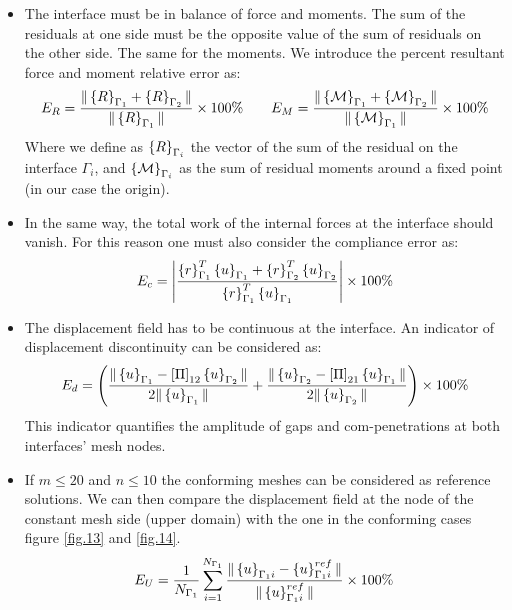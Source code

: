   \begin{itemize}
 \item The interface must be in balance of force and moments. The sum of the residuals at one side must be the opposite value of the sum of residuals on the other side. The same for the moments.
 We introduce the percent resultant force and moment relative error as:
 \begin{eqnarray}
 \label{eq.81}
 E_{R}=\frac{\|\left\lbrace{R}\right \rbrace_{\Gamma_1}+\left\lbrace{R}\right \rbrace_{\Gamma_2}\|}{\|\left\lbrace{R}\right \rbrace_{\Gamma_1}\|}\times 100 \% \qquad E_{M}=\frac{\|\left\lbrace{\mathcal{M}}\right \rbrace_{\Gamma_1}+\left\lbrace{\mathcal{M}}\right \rbrace_{\Gamma_2}\|}{\|\left\lbrace{\mathcal{M}}\right \rbrace_{\Gamma_1}\|}\times 100 \%
 \end{eqnarray}
 Where we define as $\left\lbrace{R}\right \rbrace_{\Gamma_i}$ the vector of the sum of the residual on the interface $\Gamma_i$, and $\left\lbrace{\mathcal{M}}\right \rbrace_{\Gamma_i}$ as the sum of residual moments around a fixed point (in our case the origin).
 \item In the same way, the total work of the internal forces at the interface should vanish. For this reason one must also consider the compliance error as:
 \begin{eqnarray}
 \label{eq.82}
 E_{c}=\left|\frac{\left\lbrace{r}\right \rbrace_{\Gamma_1}^T\left\lbrace{u}\right \rbrace_{\Gamma_1}+\left\lbrace{r}\right \rbrace_{\Gamma_2}^T\left\lbrace{u}\right \rbrace_{\Gamma_2}}{\left\lbrace{r}\right \rbrace_{\Gamma_1}^T\left\lbrace{u}\right \rbrace_{\Gamma_1}}\right|\times 100 \%
 \end{eqnarray}
 \item The displacement field has to be continuous at the interface. An indicator of displacement discontinuity can be considered as:
 \begin{eqnarray}
 \label{eq.83}
 E_{d}=\left(\frac{\|\left\lbrace{u}\right \rbrace_{\Gamma_1}-\left[{\Pi}\right]_{12}\left\lbrace{u}\right \rbrace_{\Gamma_2}\|}{2\|\left\lbrace{u}\right \rbrace_{\Gamma_1}\|}+\frac{\|\left\lbrace{u}\right \rbrace_{\Gamma_2}-\left[{\Pi}\right]_{21}\left\lbrace{u}\right \rbrace_{\Gamma_1}\|}{2\|\left\lbrace{u}\right \rbrace_{\Gamma_2}\|}\right)\times 100 \%
 \end{eqnarray}
 This indicator quantifies the amplitude of gaps and com-penetrations at both interfaces’ mesh nodes. 
 \item If $m\leq20$ and $n\leq 10$ the conforming meshes can be considered as reference solutions. We can then compare the displacement field at the node of the constant mesh side (upper domain) with the one in the conforming cases figure \ref{fig.13} and \ref{fig.14}.  
 \begin{eqnarray}
 \label{85}
 E_{U}=\frac{1}{N_{\Gamma_1}}\sum_{i=1}^{N_{\Gamma_1}}\frac{\|\VectorVar{u}_{\Gamma_1i}-\VectorVar{u}^{ref}_{\Gamma_1i}\|}{\|\VectorVar{u}^{ref}_{\Gamma_1i}\|}\times 100 \% 

\end{eqnarray}
\end{itemize}

